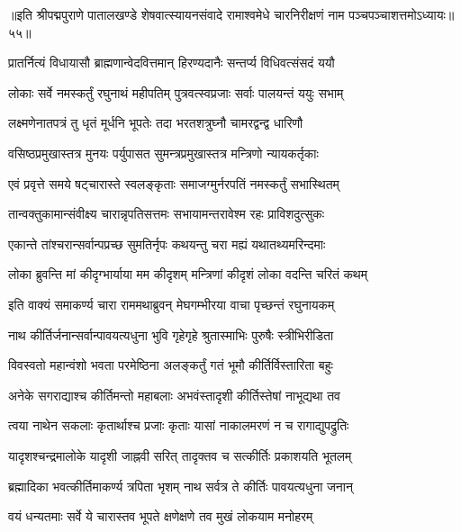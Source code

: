 {॥इति श्रीपद्मपुराणे पातालखण्डे शेषवात्स्यायनसंवादे रामाश्वमेधे चारनिरीक्षणं नाम पञ्चपञ्चाशत्तमोऽध्यायः॥५५॥}



\twolineshloka
{प्रातर्नित्यं विधायासौ ब्राह्मणान्वेदवित्तमान्}
{हिरण्यदानैः सन्तर्प्य विधिवत्संसदं ययौ}%

\twolineshloka
{लोकाः सर्वे नमस्कर्तुं रघुनाथं महीपतिम्}
{पुत्रवत्स्वप्रजाः सर्वाः पालयन्तं ययुः सभाम्}%

\twolineshloka
{लक्ष्मणेनातपत्रं तु धृतं मूर्धनि भूपतेः}
{तदा भरतशत्रुघ्नौ चामरद्वन्द्व धारिणौ}%

\twolineshloka
{वसिष्ठप्रमुखास्तत्र मुनयः पर्युपासत}
{सुमन्त्रप्रमुखास्तत्र मन्त्रिणो न्यायकर्तृकाः}%

\twolineshloka
{एवं प्रवृत्ते समये षट्चारास्ते स्वलङ्कृताः}
{समाजग्मुर्नरपतिं नमस्कर्तुं सभास्थितम्}%

\twolineshloka
{तान्वक्तुकामान्संवीक्ष्य चारान्नृपतिसत्तमः}
{सभायामन्तरावेश्म रहः प्राविशदुत्सुकः}%

\twolineshloka
{एकान्ते तांश्चरान्सर्वान्पप्रच्छ सुमतिर्नृपः}
{कथयन्तु चरा मह्यं यथातथ्यमरिन्दमाः}%

\twolineshloka
{लोका ब्रुवन्ति मां कीदृग्भार्याया मम कीदृशम्}
{मन्त्रिणां कीदृशं लोका वदन्ति चरितं कथम्}%

\twolineshloka
{इति वाक्यं समाकर्ण्य चारा राममथाब्रुवन्}
{मेघगम्भीरया वाचा पृच्छन्तं रघुनायकम्}%


\twolineshloka
{नाथ कीर्तिर्जनान्सर्वान्पावयत्यधुना भुवि}
{गृहेगृहे श्रुतास्माभिः पुरुषैः स्त्रीभिरीडिता}%

\twolineshloka
{विवस्वतो महान्वंशो भवता परमेष्ठिना}
{अलङ्कर्तुं गतं भूमौ कीर्तिर्विस्तारिता बहुः}%

\twolineshloka
{अनेके सगराद्याश्च कीर्तिमन्तो महाबलाः}
{अभवंस्तादृशी कीर्तिस्तेषां नाभूद्यथा तव}%

\twolineshloka
{त्वया नाथेन सकलाः कृतार्थाश्च प्रजाः कृताः}
{यासां नाकालमरणं न च रागाद्युपद्रुतिः}%

\twolineshloka
{यादृशश्चन्द्रमालोके यादृशी जाह्नवी सरित्}
{तादृक्तव च सत्कीर्तिः प्रकाशयति भूतलम्}%

\twolineshloka
{ब्रह्मादिका भवत्कीर्तिमाकर्ण्य त्रपिता भृशम्}
{नाथ सर्वत्र ते कीर्तिः पावयत्यधुना जनान्}%

\twolineshloka
{वयं धन्यतमाः सर्वे ये चारास्तव भूपते}
{क्षणेक्षणे तव मुखं लोकयाम मनोहरम्}%

